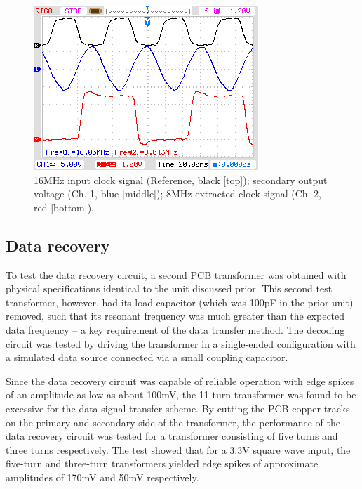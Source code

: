 \documentclass[conference]{IEEEtran}
\begin{document}
	\begin{figure}[t]
		\centering
		\includegraphics[width=0.8\columnwidth]{./img/Clock}
		\caption{16MHz input clock signal (Reference, black [top]); secondary output voltage (Ch. 1, blue [middle]); 8MHz extracted clock signal (Ch. 2, red [bottom]).}
		\label{fig:Clock}
	\end{figure}
	
	\subsection{Data recovery}
	To test the data recovery circuit, a second PCB transformer was obtained with physical specifications identical to the unit discussed prior.  This second test transformer, however, had its load capacitor (which was 100pF in the prior unit) removed, such that its resonant frequency was much greater than the expected data frequency -- a key requirement of the data transfer method.  The decoding circuit was tested by driving the transformer in a single-ended configuration with a simulated data source connected via a small coupling capacitor.
	
	Since the data recovery circuit was capable of reliable operation with edge spikes of an amplitude as low as about 100mV, the 11-turn transformer was found to be excessive for the data signal transfer scheme.  By cutting the PCB copper tracks on the primary and secondary side of the transformer, the performance of the data recovery circuit was tested for a transformer consisting of five turns and three turns respectively.  The test showed that for a 3.3V square wave input, the five-turn and three-turn transformers yielded edge spikes of approximate amplitudes of 170mV and 50mV respectively.
	
\end{document}
